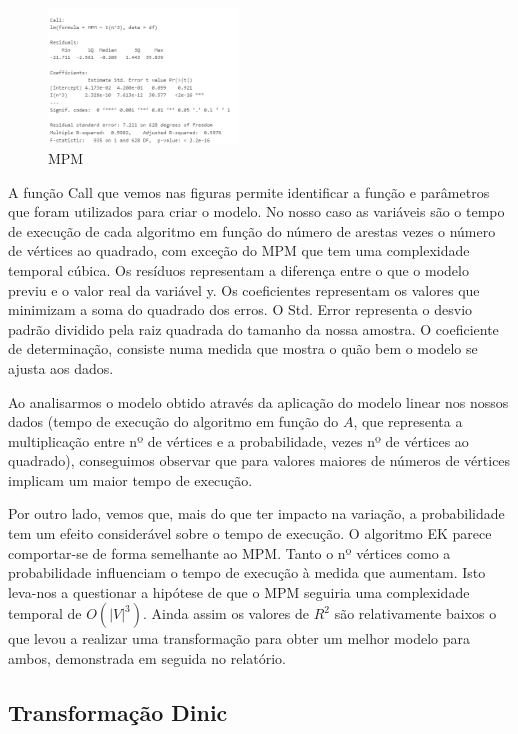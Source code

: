 \documentclass{uofa-eng-assignment}
\begin{document}
\begin{figure}
    \centering
    \includegraphics[width=0.45\textwidth]{lm mpm 1.png}
    \caption{ MPM }
    \label{fig:mpm-regression}
\end{figure}

A função Call que vemos nas figuras permite identificar a função e parâmetros que foram utilizados para criar o modelo. No nosso caso as variáveis são o tempo de execução de cada algoritmo em função do número de arestas vezes o número de vértices ao quadrado, com exceção do MPM que tem uma complexidade temporal cúbica. Os resíduos representam a diferença entre o que o modelo previu e o valor real da variável y. Os coeficientes representam os valores que minimizam a soma do quadrado dos erros. O Std. Error representa o desvio padrão dividido pela raiz quadrada do tamanho da nossa amostra.
O coeficiente de determinação, consiste numa medida que mostra o quão bem o modelo se ajusta aos dados.

Ao analisarmos o modelo obtido através da aplicação do modelo linear nos nossos dados (tempo de execução do algoritmo em função do $A$, que representa a multiplicação entre nº de vértices e a probabilidade, vezes nº de vértices ao quadrado), conseguimos observar que para valores maiores de números de vértices implicam um maior tempo de execução.

Por outro lado, vemos que, mais do que ter impacto na variação, a probabilidade tem um efeito considerável sobre o tempo de execução. O algoritmo EK parece comportar-se de forma semelhante ao MPM. Tanto o nº vértices como a probabilidade influenciam o tempo de execução à medida que aumentam. Isto leva-nos a questionar a hipótese de que o MPM seguiria uma complexidade temporal de $O(|V|^3)$. Ainda assim os valores de $R^2$ são relativamente baixos o que levou a realizar uma transformação para obter um melhor modelo para ambos, demonstrada em seguida no relatório.





\WFclear
\newpage
\subsection{Transformação Dinic}
\end{document}
